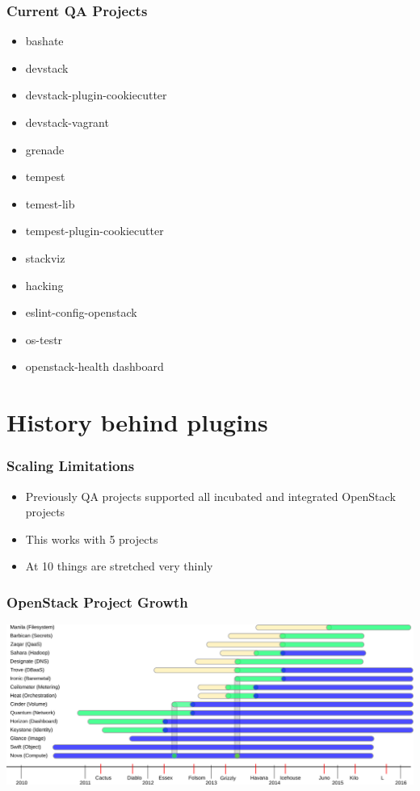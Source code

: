 \documentclass[aspectratio=169,11pt,hyperref={colorlinks=true}]{beamer}
\begin{document}
\begin{frame}
    \frametitle{Current QA Projects}
    \begin{itemize}
    \item{bashate}
    \item{devstack}
    \item{devstack-plugin-cookiecutter}
    \item{devstack-vagrant}
    \item{grenade}
    \item{tempest}
    \item{temest-lib}
    \item{tempest-plugin-cookiecutter}
    \item{stackviz}
    \item{hacking}
    \item{eslint-config-openstack}
    \item{os-testr}
    \item{openstack-health dashboard}
    \end{itemize}
\end{frame}

\section{History behind plugins}
\begin{frame}
    \frametitle{Scaling Limitations}
    \begin{itemize}
        \item Previously QA projects supported all incubated and integrated OpenStack projects
        \item This works with 5 projects
        \item At 10 things are stretched very thinly
    \end{itemize}
\end{frame}

\begin{frame}
    \frametitle{OpenStack Project Growth}
    \begin{center}
        \includegraphics[width=\textwidth]{OpenStack_Components.png}
    \end{center}
\end{frame}
\end{document}
